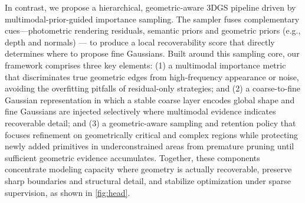 \documentclass{article}
\begin{document}
  
   In contrast,  we propose a hierarchical, geometric-aware 3DGS pipeline driven by multimodal-prior-guided importance sampling. The sampler fuses complementary cues—photometric rendering residuals, semantic priors and geometric priors (e.g., depth and normals) — to produce a local recoverability score that directly determines where to propose fine Gaussians. Built around this sampling core, our framework comprises three key elements:  (1) a multimodal importance metric that discriminates true geometric edges from high-frequency appearance or noise, avoiding the overfitting pitfalls of residual-only strategies; and (2) a coarse-to-fine Gaussian representation in which a stable coarse layer encodes global shape and fine Gaussians are injected selectively where multimodal evidence indicates recoverable detail; and (3) a geometric-aware sampling and retention policy that focuses refinement on geometrically critical and complex regions while protecting newly added primitives in underconstrained areas from premature pruning until sufficient geometric evidence accumulates. Together, these components concentrate modeling capacity where geometry is actually recoverable, preserve sharp boundaries and structural detail, and stabilize optimization under sparse supervision, as shown in \cref{fig:head}.
  
  
  
  
\end{document}
